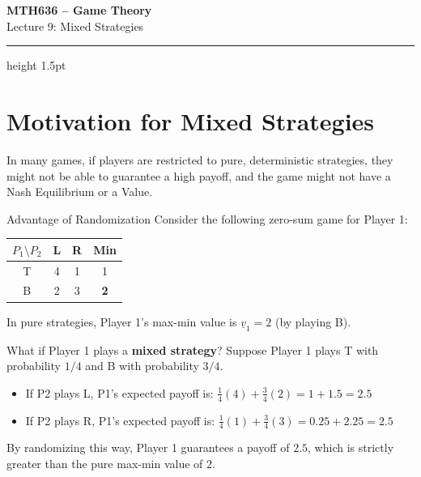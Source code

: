 \documentclass[12pt, a4paper]{article}
\begin{document}
\begin{center}
  {\LARGE\bfseries\sffamily\color{defblue} MTH636 -- Game Theory}\\[6pt]
  {\Large\sffamily Lecture 9: Mixed Strategies}\\[4pt]
\end{center}
\vspace{0.5cm}
\hrule height 1.5pt
\vspace{0.3cm}

\section{Motivation for Mixed Strategies}

In many games, if players are restricted to pure, deterministic strategies, they might not be able to guarantee a high payoff, and the game might not have a Nash Equilibrium or a Value.

\begin{exbox}{Advantage of Randomization}
  Consider the following zero-sum game for Player 1:
  \begin{center}
  \renewcommand{\arraystretch}{1.3}
  \begin{tabular}{c|cc|c}
    $P_1 \setminus P_2$ & L & R & \textbf{Min} \\
    \hline
    T & 4 & 1 & 1 \\
    B & 2 & 3 & \textbf{2} \\
    \hline
  \end{tabular}
  \end{center}
  In pure strategies, Player 1's max-min value is $\underline{v}_1 = 2$ (by playing B).
  
  What if Player 1 plays a \textbf{mixed strategy}? Suppose Player 1 plays T with probability $1/4$ and B with probability $3/4$.
  \begin{itemize}
      \item If P2 plays L, P1's expected payoff is: $\frac{1}{4}(4) + \frac{3}{4}(2) = 1 + 1.5 = 2.5$
      \item If P2 plays R, P1's expected payoff is: $\frac{1}{4}(1) + \frac{3}{4}(3) = 0.25 + 2.25 = 2.5$
  \end{itemize}
  By randomizing this way, Player 1 guarantees a payoff of $2.5$, which is strictly greater than the pure max-min value of $2$.
\end{exbox}

\end{document}

